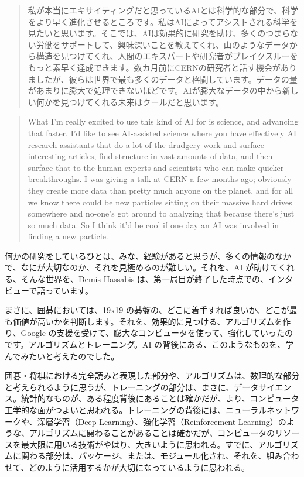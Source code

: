 \documentclass[
]{bxjsbook}
\theoremstyle{definition}
\theoremstyle{definition}
\theoremstyle{definition}
\theoremstyle{definition}
\theoremstyle{remark}
\begin{document}
\begin{quote}
私が本当にエキサイティングだと思っているAIとは科学的な部分で、科学をより早く進化させるところです。私はAIによってアシストされる科学を見たいと思います。そこでは、AIは効果的に研究を助け、多くのつまらない労働をサポートして、興味深いことを教えてくれ、山のようなデータから構造を見つけてくれ、人間のエキスパートや研究者がブレイクスルーをもっと素早く達成できます。数カ月前にCERNの研究者と話す機会がありましたが、彼らは世界で最も多くのデータと格闘しています。データの量があまりに膨大で処理できないほどです。AIが膨大なデータの中から新しい何かを見つけてくれる未来はクールだと思います。
\end{quote}

\begin{quote}
What I'm really excited to use this kind of AI for is science, and advancing that faster. I'd like to see AI-assisted science where you have effectively AI research assistants that do a lot of the drudgery work and surface interesting articles, find structure in vast amounts of data, and then surface that to the human experts and scientists who can make quicker breakthroughs. I was giving a talk at CERN a few months ago; obviously they create more data than pretty much anyone on the planet, and for all we know there could be new particles sitting on their massive hard drives somewhere and no-one's got around to analyzing that because there's just so much data. So I think it'd be cool if one day an AI was involved in finding a new particle.
\end{quote}

何かの研究をしているひとは、みな、経験があると思うが、多くの情報のなかで、なにが大切なのか、それを見極めるのが難しい。それを、AI が助けてくれる、そんな世界を、Demis Hassabis は、第一局目が終了した時点での、インタビューで語っています。

まさに、囲碁においては、19x19 の碁盤の、どこに着手すれば良いか、どこが最も価値が高いかを判断します。それを、効果的に見つける、アルゴリズムを作り、Google の支援を受けて、膨大なコンピュータを使って、強化していったのです。アルゴリズムとトレーニング。AI の背後にある、このようなものを、学んでみたいと考えたのでした。

囲碁・将棋における完全読みと表現した部分や、アルゴリズムは、数理的な部分と考えられるように思うが、トレーニングの部分は、まさに、データサイエンス。統計的なものが、ある程度背後にあることは確かだが、より、コンピュータ工学的な面がつよいと思われる。トレーニングの背後には、ニューラルネットワークや、深層学習（Deep Learning）、強化学習（Reinforcement Learning）のような、アルゴリズムに関わることがあることは確かだが、コンピュータのリソースを最大限に用いる技術がやはり、大きいように思われる。すでに、アルゴリズムに関わる部分は、パッケージ、または、モジュール化され、それを、組み合わせて、どのように活用するかが大切になっているように思われる。
\end{document}
